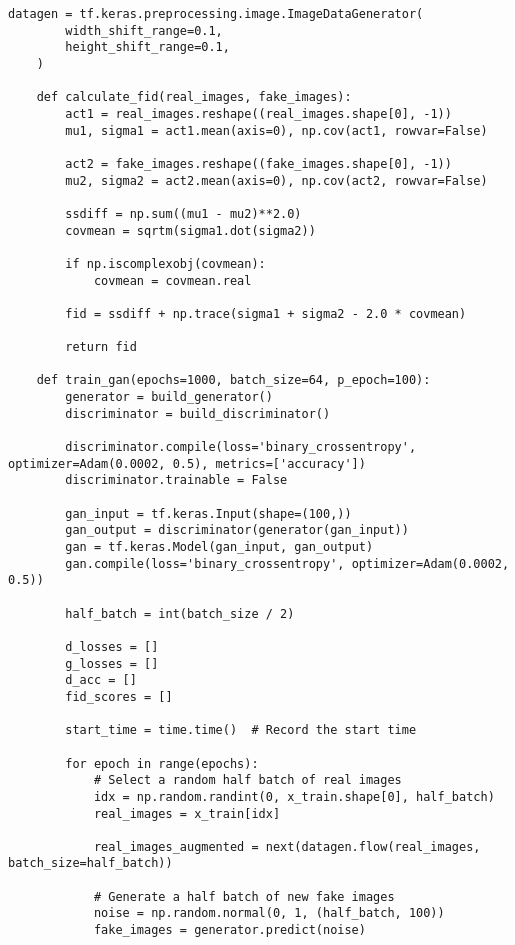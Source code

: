 \begin{lstlisting}[style=mypython, caption=Explore data augmetation 3]
    datagen = tf.keras.preprocessing.image.ImageDataGenerator(
        width_shift_range=0.1,
        height_shift_range=0.1,
    )
    
    def calculate_fid(real_images, fake_images):
        act1 = real_images.reshape((real_images.shape[0], -1))
        mu1, sigma1 = act1.mean(axis=0), np.cov(act1, rowvar=False)
        
        act2 = fake_images.reshape((fake_images.shape[0], -1))
        mu2, sigma2 = act2.mean(axis=0), np.cov(act2, rowvar=False)
        
        ssdiff = np.sum((mu1 - mu2)**2.0)
        covmean = sqrtm(sigma1.dot(sigma2))
        
        if np.iscomplexobj(covmean):
            covmean = covmean.real
        
        fid = ssdiff + np.trace(sigma1 + sigma2 - 2.0 * covmean)
        
        return fid
    
    def train_gan(epochs=1000, batch_size=64, p_epoch=100):
        generator = build_generator()
        discriminator = build_discriminator()
    
        discriminator.compile(loss='binary_crossentropy', optimizer=Adam(0.0002, 0.5), metrics=['accuracy'])
        discriminator.trainable = False
    
        gan_input = tf.keras.Input(shape=(100,))
        gan_output = discriminator(generator(gan_input))
        gan = tf.keras.Model(gan_input, gan_output)
        gan.compile(loss='binary_crossentropy', optimizer=Adam(0.0002, 0.5))
    
        half_batch = int(batch_size / 2)
        
        d_losses = []
        g_losses = []
        d_acc = []
        fid_scores = []
        
        start_time = time.time()  # Record the start time
    
        for epoch in range(epochs):
            # Select a random half batch of real images
            idx = np.random.randint(0, x_train.shape[0], half_batch)
            real_images = x_train[idx]
    
            real_images_augmented = next(datagen.flow(real_images, batch_size=half_batch))
    
            # Generate a half batch of new fake images
            noise = np.random.normal(0, 1, (half_batch, 100))
            fake_images = generator.predict(noise)
    

\end{lstlisting}
